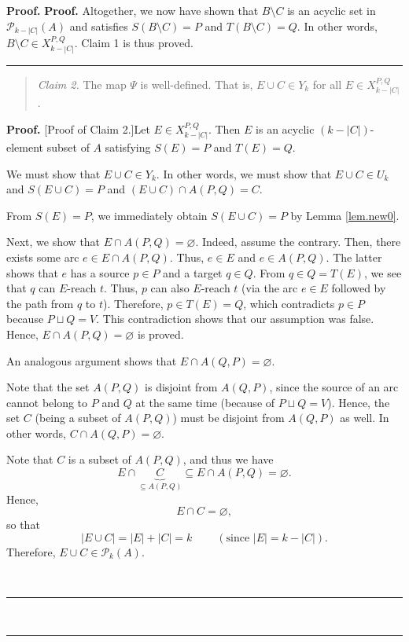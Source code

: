 \documentclass[numbers=enddot,12pt,final,onecolumn,notitlepage]{scrartcl}%
\theoremstyle{definition}
\newenvironment{statement}{\begin{quote}}{\end{quote}}
\newenvironment{proof}[1][Proof]{\noindent\textbf{#1.} }{\ \rule{0.5em}{0.5em}}
\theoremstyle{plainsl}
\begin{document}
\begin{proof}
\begin{proof}
Altogether, we now have shown that $B\setminus C$ is an acyclic set in
$\mathcal{P}_{k-\left\vert C\right\vert }\left(  A\right)  $ and satisfies
$S\left(  B\setminus C\right)  =P$ and $T\left(  B\setminus C\right)  =Q$. In
other words, $B\setminus C\in X_{k-\left\vert C\right\vert }^{P,Q}$. Claim 1
is thus proved.
\end{proof}

\begin{statement}
\textit{Claim 2.} The map $\Psi$ is well-defined. That is, $E\cup C\in Y_{k}$
for all $E\in X_{k-|C|}^{P,Q}$.
\end{statement}

\begin{proof}
[Proof of Claim 2.]Let $E\in X_{k-|C|}^{P,Q}$. Then $E$ is an acyclic $\left(
k-\left\vert C\right\vert \right)  $-element subset of $A$ satisfying
$S\left(  E\right)  =P$ and $T\left(  E\right)  =Q$.

We must show that $E\cup C\in Y_{k}$. In other words, we must show that $E\cup
C\in U_{k}$ and $S\left(  E\cup C\right)  =P$ and $\left(  E\cup C\right)
\cap A\left(  P,Q\right)  =C$.

From $S\left(  E\right)  =P$, we immediately obtain $S\left(  E\cup C\right)
=P$ by Lemma \ref{lem.new0}.

Next, we show that $E\cap A\left(  P,Q\right)  =\varnothing$. Indeed, assume
the contrary. Then, there exists some arc $e\in E\cap A\left(  P,Q\right)  $.
Thus, $e\in E$ and $e\in A\left(  P,Q\right)  $. The latter shows that $e$ has
a source $p\in P$ and a target $q\in Q$. From $q\in Q=T\left(  E\right)  $, we
see that $q$ can $E$-reach $t$. Thus, $p$ can also $E$-reach $t$ (via the arc
$e\in E$ followed by the path from $q$ to $t$). Therefore, $p\in T\left(
E\right)  =Q$, which contradicts $p\in P$ because $P\sqcup Q=V$. This
contradiction shows that our assumption was false. Hence, $E\cap A\left(
P,Q\right)  =\varnothing$ is proved.

An analogous argument shows that $E\cap A\left(  Q,P\right)  =\varnothing$.

Note that the set $A\left(  P,Q\right)  $ is disjoint from $A\left(
Q,P\right)  $, since the source of an arc cannot belong to $P$ and $Q$ at the
same time (because of $P\sqcup Q=V$). Hence, the set $C$ (being a subset of
$A\left(  P,Q\right)  $) must be disjoint from $A\left(  Q,P\right)  $ as
well. In other words, $C\cap A\left(  Q,P\right)  =\varnothing$.

Note that $C$ is a subset of $A\left(  P,Q\right)  $, and thus we have
\[
E\cap\underbrace{C}_{\subseteq A\left(  P,Q\right)  }\subseteq E\cap A\left(
P,Q\right)  =\varnothing.
\]
Hence,
\begin{equation}
E\cap C=\varnothing,\label{pf.lem.new4.c2.pf.empty}%
\end{equation}
so that%
\[
\left\vert E\cup C\right\vert =\left\vert E\right\vert +\left\vert
C\right\vert =k\ \ \ \ \ \ \ \ \ \ \left(  \text{since }\left\vert
E\right\vert =k-\left\vert C\right\vert \right)  .
\]
Therefore, $E\cup C\in\mathcal{P}_{k}\left(  A\right)  $.


\end{proof}
\end{proof}
\end{document}
